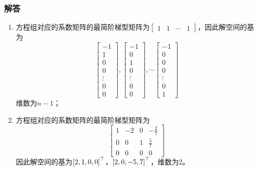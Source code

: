 \documentclass{beamer}
\begin{document}
\begin{frame}[allowframebreaks]
    \frametitle{解答}
    \begin{enumerate}
        \item {
              方程组对应的系数矩阵的最简阶梯型矩阵为\(\begin{bmatrix}1&1&\cdots&1\end{bmatrix}\)，因此解空间的基为
              \begin{equation*}
                  \begin{bmatrix}-1\\1\\0\\0\\\vdots\\0\\0\end{bmatrix},
                  \begin{bmatrix}-1\\0\\1\\0\\\vdots\\0\\0\end{bmatrix},\cdots
                  \begin{bmatrix}-1\\0\\0\\0\\\vdots\\0\\1\end{bmatrix}
              \end{equation*}
              维数为\(n-1\)；
              }
        \item {
              方程组对应的系数矩阵的最简阶梯型矩阵为
              \begin{equation*}
                  \begin{bmatrix}
                      1 & -2 & 0 & -\frac{2}{7} \\
                      0 & 0  & 1 & \frac{5}{7}  \\
                      0 & 0  & 0 & 0
                  \end{bmatrix}
              \end{equation*}
              因此解空间的基为\(\left[ 2,1,0,0 \right]^\top\)，\(\left[ 2,0,-5,7 \right]^\top\)，维数为\(2\)。
              }
    \end{enumerate}
\end{frame}
\end{document}
